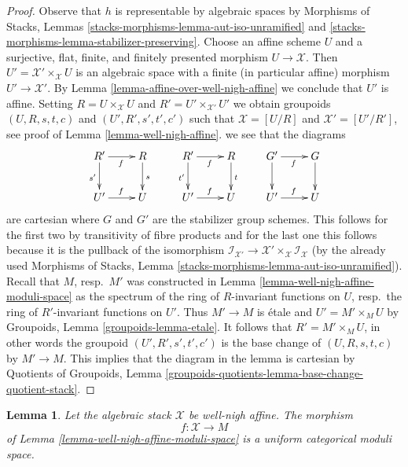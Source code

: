 \documentclass{stacks-project}
\theoremstyle{plain}
\newtheorem{lemma}[subsection]{Lemma}
\theoremstyle{definition}
\theoremstyle{remark}
\numberwithin{equation}{subsection}
\begin{document}
\begin{proof}
Observe that $h$ is representable by algebraic spaces by
Morphisms of Stacks, Lemmas
\ref{stacks-morphisms-lemma-aut-iso-unramified} and
\ref{stacks-morphisms-lemma-stabilizer-preserving}.
Choose an affine scheme $U$ and a
surjective, flat, finite, and finitely presented morphism $U \to \mathcal{X}$.
Then $U' = \mathcal{X}' \times_\mathcal{X} U$ is an algebraic
space with a finite (in particular affine) morphism $U' \to \mathcal{X}'$.
By Lemma \ref{lemma-affine-over-well-nigh-affine}
we conclude that $U'$ is affine.
Setting $R = U \times_\mathcal{X} U$ and $R' = U' \times_{\mathcal{X}'} U'$
we obtain groupoids $(U, R, s, t, c)$ and $(U', R', s', t', c')$
such that $\mathcal{X} = [U/R]$ and $\mathcal{X}' = [U'/R']$,
see proof of Lemma \ref{lemma-well-nigh-affine}.
we see that the diagrams
$$
\xymatrix{
R' \ar[d]_{s'} \ar[r]_f & R \ar[d]^s \\
U' \ar[r]^f & U
}
\quad
\quad
\xymatrix{
R' \ar[d]_{t'} \ar[r]_f & R \ar[d]^t \\
U' \ar[r]^f & U
}
\quad
\quad
\xymatrix{
G' \ar[d] \ar[r]_f & G \ar[d] \\
U' \ar[r]^f & U
}
$$
are cartesian where $G$ and $G'$ are the stabilizer group schemes.
This follows for the first two by transitivity of fibre products
and for the last one this follows because it is the pullback of the
isomorphism $\mathcal{I}_{\mathcal{X}'} \to
\mathcal{X}' \times_\mathcal{X} \mathcal{I}_\mathcal{X}$
(by the already used Morphisms of Stacks, Lemma
\ref{stacks-morphisms-lemma-aut-iso-unramified}).
Recall that $M$, resp.\ $M'$ was constructed in
Lemma \ref{lemma-well-nigh-affine-moduli-space}
as the spectrum of the ring of $R$-invariant functions on $U$,
resp.\ the ring of $R'$-invariant functions on $U'$.
Thus $M' \to M$ is \'etale and $U' = M' \times_M U$
by Groupoids, Lemma \ref{groupoids-lemma-etale}.
It follows that $R' = M' \times_M U$, in other words
the groupoid $(U', R', s', t', c')$ is the base change of
$(U, R, s, t, c)$ by $M' \to M$.
This implies that the diagram in the lemma is
cartesian by
Quotients of Groupoids, Lemma
\ref{groupoids-quotients-lemma-base-change-quotient-stack}.
\end{proof}

\begin{lemma}
\label{lemma-moduli-space-finite-affine}
Let the algebraic stack $\mathcal{X}$ be well-nigh affine. The morphism
$$
f : \mathcal{X} \longrightarrow M
$$
of Lemma \ref{lemma-well-nigh-affine-moduli-space}
is a uniform categorical moduli space.
\end{lemma}
\end{document}
